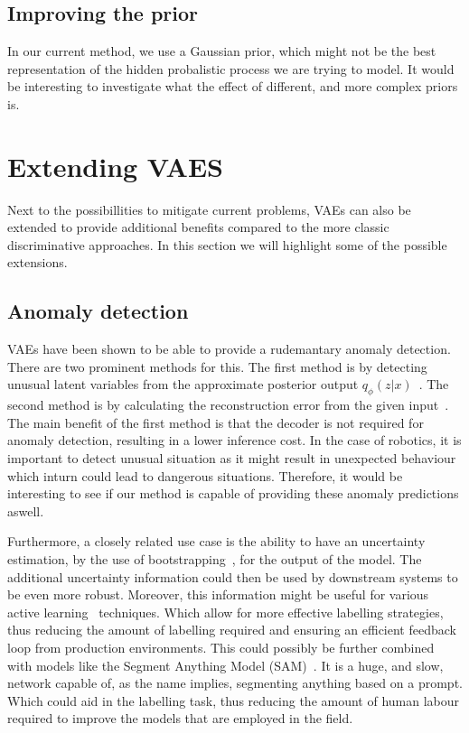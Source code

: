 \subsection{Improving the prior}
In our current method, we use a Gaussian prior, which might not be the best representation of the hidden probalistic process we are trying to model. It would be interesting to investigate what the effect of different, and more complex priors is.

\section{Extending VAES}
Next to the possibillities to mitigate current problems, VAEs can also be extended to provide additional benefits compared to the more classic discriminative approaches. In this section we will highlight some of the possible extensions.

\subsection{Anomaly detection}
VAEs have been shown to be able to provide a rudemantary anomaly detection. There are two prominent methods for this. The first method is by detecting unusual latent variables from the approximate posterior output $q_{\phi}(z|x)$~\cite{marimont2020anomalydetectionlatentspace,angiulli2020improving,angiulli2023latent}. The second method is by calculating the reconstruction error from the given input~\cite{an2015variational, zhou2020unsupervisedanomalylocalizationusing, gouda2022unsupervised}. The main benefit of the first method is that the decoder is not required for anomaly detection, resulting in a lower inference cost. In the case of robotics, it is important to detect unusual situation as it might result in unexpected behaviour which inturn could lead to dangerous situations. Therefore, it would be interesting to see if our method is capable of providing these anomaly predictions aswell.

Furthermore, a closely related use case is the ability to have an uncertainty estimation, by the use of bootstrapping~\cite{chen2018use,kohl2018probabilistic}, for the output of the model. The additional uncertainty information could then be used by downstream systems to be even more robust. Moreover, this information might be useful for various active learning~\cite{hino2020active} techniques. Which allow for more effective labelling strategies, thus reducing the amount of labelling required and ensuring an efficient feedback loop from production environments. This could possibly be further combined with models like the Segment Anything Model (SAM)~\cite{kirillov2023segment}. It is a huge, and slow, network capable of, as the name implies, segmenting anything based on a prompt. Which could aid in the labelling task, thus reducing the amount of human labour required to improve the models that are employed in the field.

